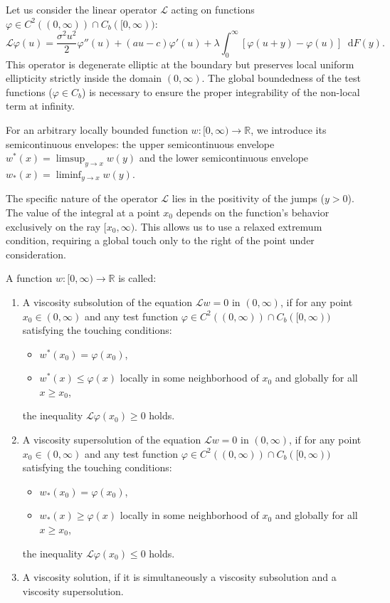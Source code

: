 \documentclass[smallextended]{svjour3}
\providecommand{\diff}{\mathop{}\!\mathrm{d}}
\begin{document}
Let us consider the linear operator $\mathcal{L}$ acting on functions $\varphi \in C^2((0, \infty)) \cap C_b([0, \infty))$:
\begin{equation*}
\mathcal{L}\varphi(u) = \frac{\sigma^2 u^2}{2} \varphi''(u) + (a u - c)\varphi'(u) + \lambda \int_0^\infty[\varphi(u+y) - \varphi(u)] \diff F(y).
\end{equation*}
This operator is degenerate elliptic at the boundary but preserves local uniform ellipticity strictly inside the domain $(0, \infty)$. The global boundedness of the test functions ($\varphi \in C_b$) is necessary to ensure the proper integrability of the non-local term at infinity.

For an arbitrary locally bounded function $w:[0, \infty) \to \mathbb{R}$, we introduce its semicontinuous envelopes: the upper semicontinuous envelope $w^*(x) = \limsup_{y \to x} w(y)$ and the lower semicontinuous envelope $w_*(x) = \liminf_{y \to x} w(y)$.

The specific nature of the operator $\mathcal{L}$ lies in the positivity of the jumps ($y > 0$). The value of the integral at a point $x_0$ depends on the function's behavior exclusively on the ray $[x_0, \infty)$. This allows us to use a relaxed extremum condition, requiring a global touch only to the right of the point under consideration.

\begin{definition}
\label{def:viscosity_sol}
A function $w:[0, \infty) \to \mathbb{R}$ is called:
\begin{enumerate}
    \item A viscosity subsolution of the equation $\mathcal{L} w = 0$ in $(0, \infty)$, if for any point $x_0 \in (0, \infty)$ and any test function $\varphi \in C^2((0, \infty)) \cap C_b([0, \infty))$ satisfying the touching conditions:
    \begin{itemize}
        \item $w^*(x_0) = \varphi(x_0)$,
        \item $w^*(x) \le \varphi(x)$ locally in some neighborhood of $x_0$ and globally for all $x \ge x_0$,
    \end{itemize}
    the inequality $\mathcal{L}\varphi(x_0) \ge 0$ holds.

    \item A viscosity supersolution of the equation $\mathcal{L} w = 0$ in $(0, \infty)$, if for any point $x_0 \in (0, \infty)$ and any test function $\varphi \in C^2((0, \infty)) \cap C_b([0, \infty))$ satisfying the touching conditions:
    \begin{itemize}
        \item $w_*(x_0) = \varphi(x_0)$,
        \item $w_*(x) \ge \varphi(x)$ locally in some neighborhood of $x_0$ and globally for all $x \ge x_0$,
    \end{itemize}
    the inequality $\mathcal{L}\varphi(x_0) \le 0$ holds.

    \item A viscosity solution, if it is simultaneously a viscosity subsolution and a viscosity supersolution.
\end{enumerate}
\end{definition}
\end{document}
